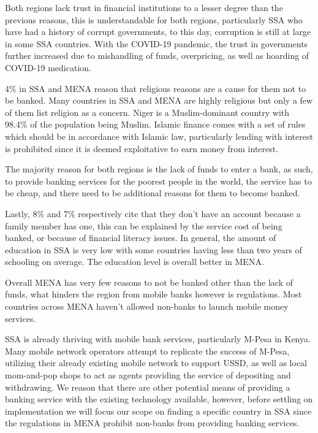 \documentclass[11pt, a4paper]{article}
\begin{document}
Both regions lack trust in financial institutions to a lesser degree than the previous reasons, this is understandable for both regions, particularly SSA who have had a history of corrupt governments, to this day, corruption is still at large in some SSA countries. With the COVID-19 pandemic, the trust in governments further increased due to mishandling of funds, overpricing, as well as hoarding of COVID-19 medication\cite{cpi2020}.

4\% in SSA and MENA reason that religious reasons are a cause for them not to be banked. Many countries in SSA and MENA are highly religious but only a few of them list religion as a concern. Niger is a Muslim-dominant country with 98.4\% of the population being Muslim\cite{muslim}. Islamic finance comes with a set of rules which should be in accordance with Islamic law, particularly lending with interest is prohibited since it is deemed exploitative to earn money from interest\cite{islam_invest}.

The majority reason for both regions is the lack of funds to enter a bank, as such, to provide banking services for the poorest people in the world, the service has to be cheap, and there need to be additional reasons for them to become banked.

Lastly, 8\% and 7\% respectively cite that they don't have an account because a family member has one, this can be explained by the service cost of being banked, or because of financial literacy issues. In general, the amount of education in SSA is very low with some countries having less than two years of schooling on average\cite{hdr}. The education level is overall better in MENA\cite{hdr}.

Overall MENA has very few reasons to not be banked other than the lack of funds, what hinders the region from mobile banks however is regulations. Most countries across MENA haven't allowed non-banks to launch mobile money services.\cite{gsmareg}

SSA is already thriving with mobile bank services, particularly M-Pesa in Kenya. Many mobile network operators attempt to replicate the success of M-Pesa, utilizing their already existing mobile network to support USSD, as well as local mom-and-pop shops to act as agents providing the service of depositing and withdrawing. We reason that there are other potential means of providing a banking service with the existing technology available, however, before settling on implementation we will focus our scope on finding a specific country in SSA since the regulations in MENA prohibit non-banks from providing banking services.
\end{document}
